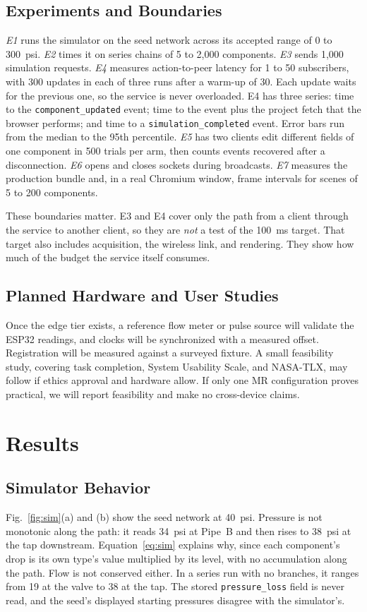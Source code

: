 \documentclass[conference]{IEEEtran}
\newcommand{\flowValve}{19}
\newcommand{\pressPipeB}{34}
\newcommand{\pressTap}{38}
\newcommand{\flowTap}{38}
\newcommand{\rttN}{1{,}000}
\newcommand{\lostTrials}{500}
\begin{document}
\subsection{Experiments and Boundaries}
\emph{E1} runs the simulator on the seed network across its accepted range of 0 to 300~psi. \emph{E2} times it on series chains of 5 to 2,000 components. \emph{E3} sends \rttN{} simulation requests. \emph{E4} measures action-to-peer latency for 1 to 50 subscribers, with 300 updates in each of three runs after a warm-up of 30. Each update waits for the previous one, so the service is never overloaded. E4 has three series: time to the \texttt{component\_updated} event; time to the event plus the project fetch that the browser performs; and time to a \texttt{simulation\_completed} event. Error bars run from the median to the 95th percentile. \emph{E5} has two clients edit different fields of one component in \lostTrials{} trials per arm, then counts events recovered after a disconnection. \emph{E6} opens and closes sockets during broadcasts. \emph{E7} measures the production bundle and, in a real Chromium window, frame intervals for scenes of 5 to 200 components.

These boundaries matter. E3 and E4 cover only the path from a client through the service to another client, so they are \emph{not} a test of the 100~ms target. That target also includes acquisition, the wireless link, and rendering. They show how much of the budget the service itself consumes.

\subsection{Planned Hardware and User Studies}
Once the edge tier exists, a reference flow meter or pulse source will validate the ESP32 readings, and clocks will be synchronized with a measured offset. Registration will be measured against a surveyed fixture. A small feasibility study, covering task completion, System Usability Scale, and NASA-TLX, may follow if ethics approval and hardware allow. If only one MR configuration proves practical, we will report feasibility and make no cross-device claims.

\section{Results}
\label{sec:results}
\subsection{Simulator Behavior}
\label{sec:simresults}
Fig.~\ref{fig:sim}(a) and (b) show the seed network at 40~psi. Pressure is not monotonic along the path: it reads \pressPipeB{}~psi at Pipe~B and then rises to \pressTap{}~psi at the tap downstream. Equation~\eqref{eq:sim} explains why, since each component's drop is its own type's value multiplied by its level, with no accumulation along the path. Flow is not conserved either. In a series run with no branches, it ranges from \flowValve{} at the valve to \flowTap{} at the tap. The stored \texttt{pressure\_loss} field is never read, and the seed's displayed starting pressures disagree with the simulator's.
\end{document}
